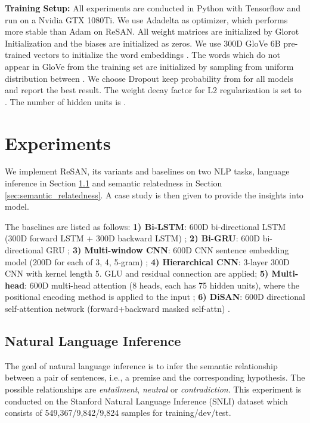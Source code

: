 \documentclass{article}
\begin{document}
\textbf{Training Setup:} All experiments are conducted in Python with Tensorflow and run on a Nvidia GTX 1080Ti. We use Adadelta as optimizer, which performs more stable than Adam on ReSAN. All weight matrices are initialized by Glorot Initialization \cite{glorot2010understanding} and the biases are initialized as zeros. We use 300D GloVe 6B pre-trained vectors \cite{pennington2014glove} to initialize the word embeddings \cite{liu2018semantic}. The words which do not appear in GloVe from the training set are initialized by sampling from uniform distribution between . We choose Dropout \cite{srivastava2014dropout} keep probability from  for all models and report the best result. The weight decay factor  for L2 regularization is set to . The number of hidden units is . 

\section{Experiments}

We implement ReSAN, its variants and baselines on two NLP tasks, language inference in Section \ref{sec:nli} and semantic relatedness in Section \ref{sec:semantic_relatedness}. A case study is then given to provide the insights into model. 

The baselines are listed as follows: 
\textbf{1) Bi-LSTM}: 600D bi-directional LSTM (300D forward LSTM + 300D backward LSTM) \cite{graves2013hybrid}; 
\textbf{2) Bi-GRU}: 600D bi-directional GRU \cite{chung2014empirical}; 
\textbf{3) Multi-window CNN}:  600D CNN sentence embedding model (200D for each of 3, 4, 5-gram) \cite{kim2014convolutional}; 
\textbf{4) Hierarchical CNN}: 3-layer 300D CNN \cite{gehring2017convolutional} with kernel length 5. GLU \cite{dauphin2016language} and residual connection \cite{he2016deep} are applied;
\textbf{5) Multi-head}: 600D multi-head attention (8 heads, each has 75 hidden units), where the positional encoding method is applied to the input \cite{vaswani2017attention};
\textbf{6) DiSAN}: 600D directional self-attention network (forward+backward masked self-attn) \cite{shen2017disan}.


\subsection{Natural Language Inference} \label{sec:nli}

The goal of natural language inference is to infer the semantic relationship between a pair of sentences, i.e., a premise and the corresponding hypothesis. The possible relationships are \textit{entailment}, \textit{neutral} or \textit{contradiction}. This experiment is conducted on the Stanford Natural Language Inference \cite{bowman2015snli} (SNLI) dataset which consists of 549,367/9,842/9,824 samples for training/dev/test.
\end{document}
